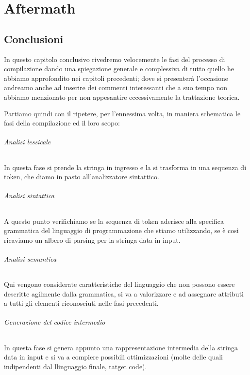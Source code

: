 \documentclass[class=book, crop=false, oneside, 12pt]{standalone}
\begin{document}
\part{Aftermath}
\chapter{Conclusioni}
In questo capitolo conclusivo rivedremo velocemente le fasi del  processo di compilazione dando una spiegazione generale e complessiva di tutto quello he abbiamo approfondito nei capitoli precedenti; dove si presenterà l'occasione andreamo anche ad inserire dei commenti interessanti che a suo tempo non abbiamo menzionato per non appesantire eccessivamente la trattazione teorica.

Partiamo quindi con il ripetere, per l'ennessima volta, in maniera schematica le fasi della compilazione ed il loro scopo:
\paragraph{Analisi lessicale} In questa fase si prende la stringa in ingresso e la si trasforma in una sequenza di token, che diamo in pasto all'analizzatore sintattico.

\paragraph{Analisi sintattica} A questo punto verifichiamo se la sequenza di token aderisce alla specifica grammatica del linguaggio di programmazione che stiamo utilizzando, se è così ricaviamo un albero di parsing per la stringa data in input. 

\paragraph{Analisi semantica} Qui vengono considerate caratteristiche del linguaggio che non possono essere descritte agilmente dalla grammatica, si va a valorizzare e ad assegnare attributi a tutti gli elementi riconosciuti nelle fasi precedenti.
	
\paragraph{Generazione del codice intermedio} In questa fase si genera appunto una rappresentazione intermedia della stringa data in input e si va a compiere possibili ottimizzazioni (molte delle quali indipendenti dal llinguaggio finale, tatget code).
\end{document}
